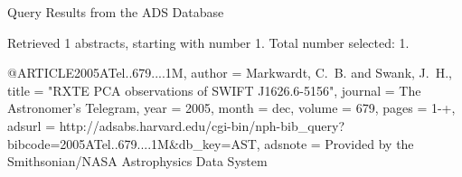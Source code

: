 Query Results from the ADS Database


Retrieved 1 abstracts, starting with number 1.  Total number selected: 1.

@ARTICLE{2005ATel..679....1M,
   author = {{Markwardt}, C.~B. and {Swank}, J.~H.},
    title = "{RXTE PCA observations of SWIFT J1626.6-5156}",
  journal = {The Astronomer's Telegram},
     year = 2005,
    month = dec,
   volume = 679,
    pages = {1-+},
   adsurl = {http://adsabs.harvard.edu/cgi-bin/nph-bib_query?bibcode=2005ATel..679....1M&db_key=AST},
  adsnote = {Provided by the Smithsonian/NASA Astrophysics Data System}
}


